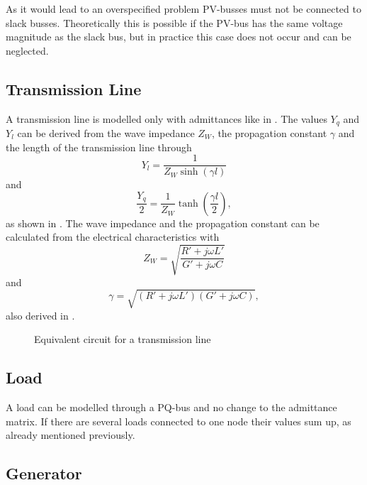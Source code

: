 As it would lead to an overspecified problem PV-busses must not be connected to slack busses. Theoretically this is possible if the PV-bus has the same voltage magnitude as the slack bus, but in practice this case does not occur and can be neglected.

\subsection{Transmission Line}
A transmission line is modelled only with admittances like in . The values $Y_q$ and $Y_l$ can be derived from the wave impedance $Z_W$, the propagation constant $\gamma$ and the length of the transmission line through
\begin{equation}
	Y_l = \frac{1}{Z_W \sinh \left( \gamma l \right)}
\end{equation}
and
\begin{equation}
	\frac{Y_q}{2} = \frac{1}{Z_W} \tanh \left( \frac{\gamma l}{2} \right),
\end{equation}
as shown in \citep[p. 155]{powerSystemAnalysis}. The wave impedance and the propagation constant can be calculated from the electrical characteristics with
\begin{equation}
	Z_W = \sqrt{\frac{R' + j \omega L'}{G' + j \omega C}}
\end{equation}
and 
\begin{equation}
	\gamma = \sqrt{\left( R' + j \omega L' \right) \left( G' + j \omega C \right)},
\end{equation}
also derived in \citep[p. 153]{powerSystemAnalysis}.

\begin{figure}
	\centering
	
	\caption{Equivalent circuit for a transmission line}
	\label{fig:transmission_line}
\end{figure}

\subsection{Load}
A load can be modelled through a PQ-bus and no change to the admittance matrix. If there are several loads connected to one node their values sum up, as already mentioned previously.

\subsection{Generator}

